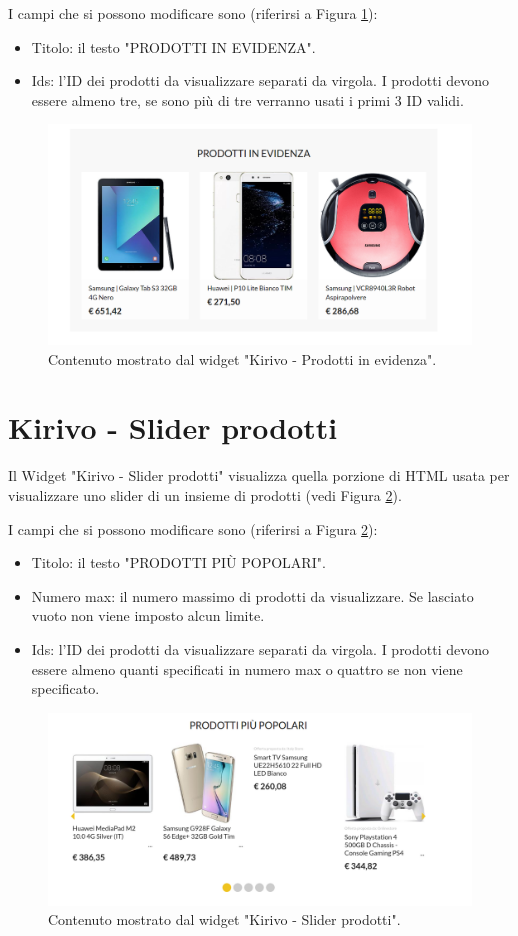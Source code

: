 I campi che si possono modificare sono (riferirsi a Figura \ref{fig:kevid}):
\begin{itemize}
\item Titolo: il testo "PRODOTTI IN EVIDENZA".
\item Ids: l'ID dei prodotti da visualizzare separati da virgola. I prodotti devono
essere almeno tre, se sono più di tre verranno usati i primi 3 ID validi.
\end{itemize}

\begin{figure}
  \includegraphics[width=\textwidth]{figure/kevid.png}
  \caption{Contenuto mostrato dal widget "Kirivo - Prodotti in evidenza".}
  \label{fig:kevid}
\end{figure}

\newpage
\section{Kirivo - Slider prodotti}


Il Widget "Kirivo - Slider prodotti"   visualizza quella porzione di HTML usata
per visualizzare uno slider di un insieme di prodotti (vedi Figura \ref{fig:kslide}).

I campi che si possono modificare sono (riferirsi a Figura \ref{fig:kslide}):
\begin{itemize}
\item Titolo: il testo "PRODOTTI PIÙ POPOLARI".
\item Numero max: il numero massimo di prodotti da visualizzare. Se lasciato vuoto non viene imposto alcun limite.
\item Ids: l'ID dei prodotti da visualizzare separati da virgola. I prodotti devono
essere almeno quanti specificati in numero max o quattro se non viene specificato.
\end{itemize}

\begin{figure}
  \includegraphics[width=\textwidth]{figure/kslide.png}
  \caption{Contenuto mostrato dal widget "Kirivo - Slider prodotti".}
  \label{fig:kslide}
\end{figure}

